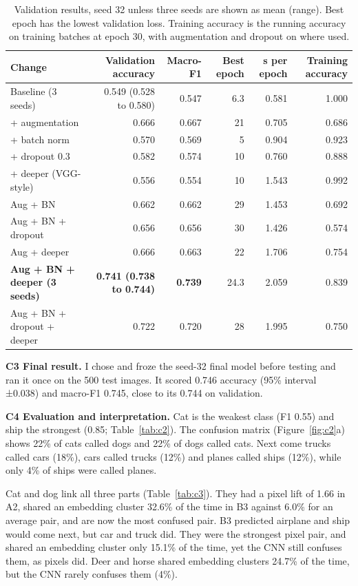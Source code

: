 \documentclass[9pt,a4paper]{extarticle}
\begin{document}
\begin{table}[H]
\centering\footnotesize
\caption{Validation results, seed 32 unless three seeds are shown as mean (range). Best epoch has the lowest validation loss. Training accuracy is the running accuracy on training batches at epoch 30, with augmentation and dropout on where used.}
\label{tab:c1}
\begin{tabular}{@{}lrrrrr@{}}
\toprule
Change & Validation accuracy & Macro-F1 & Best epoch & s per epoch & Training accuracy \\
\midrule
Baseline (3 seeds) & 0.549 (0.528 to 0.580) & 0.547 & 6.3 & 0.581 & 1.000 \\
+ augmentation & 0.666 & 0.667 & 21 & 0.705 & 0.686 \\
+ batch norm & 0.570 & 0.569 & 5 & 0.904 & 0.923 \\
+ dropout 0.3 & 0.582 & 0.574 & 10 & 0.760 & 0.888 \\
+ deeper (VGG-style) & 0.556 & 0.554 & 10 & 1.543 & 0.992 \\
Aug + BN & 0.662 & 0.662 & 29 & 1.453 & 0.692 \\
Aug + BN + dropout & 0.656 & 0.656 & 30 & 1.426 & 0.574 \\
Aug + deeper & 0.666 & 0.663 & 22 & 1.706 & 0.754 \\
\textbf{Aug + BN + deeper (3 seeds)} & \textbf{0.741 (0.738 to 0.744)} & \textbf{0.739} & 24.3 & 2.059 & 0.839 \\
Aug + BN + dropout + deeper & 0.722 & 0.720 & 28 & 1.995 & 0.750 \\
\bottomrule
\end{tabular}
\end{table}

\textbf{C3 Final result.} I chose and froze the seed-32 final model before testing and ran it once on the 500 test images. It scored 0.746 accuracy (95\% interval ±0.038) and macro-F1 0.745, close to its 0.744 on validation.

\textbf{C4 Evaluation and interpretation.} Cat is the weakest class (F1 0.55) and ship the strongest (0.85; Table~\ref{tab:c2}). The confusion matrix (Figure~\ref{fig:c2}a) shows 22\% of cats called dogs and 22\% of dogs called cats. Next come trucks called cars (18\%), cars called trucks (12\%) and planes called ships (12\%), while only 4\% of ships were called planes.

Cat and dog link all three parts (Table~\ref{tab:c3}). They had a pixel lift of 1.66 in A2, shared an embedding cluster 32.6\% of the time in B3 against 6.0\% for an average pair, and are now the most confused pair. B3 predicted airplane and ship would come next, but car and truck did. They were the strongest pixel pair, and shared an embedding cluster only 15.1\% of the time, yet the CNN still confuses them, as pixels did. Deer and horse shared embedding clusters 24.7\% of the time, but the CNN rarely confuses them (4\%).
\end{document}
